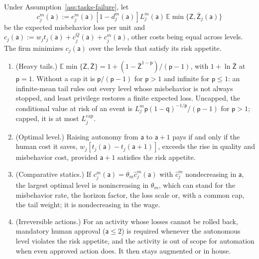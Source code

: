 \begin{proposition}\label{prop:tasks-autonomy}
Under Assumption~\ref{ass:tasks-failure}, let
\[
c^m_j(\mathsf a):=e^m_j(\mathsf a)[1-d^m_j(\mathsf a)]L^m_j(\mathsf a)\,\mathbb E\min\{\mathsf Z,\bar{\mathsf Z}_j(\mathsf a)\}
\]
be the expected misbehavior loss per unit and $c_j(\mathsf a):=w_jt_j(\mathsf a)+c^Q_j(\mathsf a)+c^m_j(\mathsf a)$, other costs being equal across levels. The firm minimizes $c_j(\mathsf a)$ over the levels that satisfy its risk appetite.
\begin{enumerate}
\item[(a)] (Heavy tails.) $\mathbb E\min\{\mathsf Z,\bar{\mathsf Z}\}=1+(1-\bar{\mathsf Z}^{1-\mathsf p})/(\mathsf p-1)$, with $1+\ln\bar{\mathsf Z}$ at $\mathsf p=1$. Without a cap it is $\mathsf p/(\mathsf p-1)$ for $\mathsf p>1$ and infinite for $\mathsf p\le 1$: an infinite-mean tail rules out every level whose misbehavior is not always stopped, and least privilege restores a finite expected loss. Uncapped, the conditional value at risk of an event is $L^m_j\mathsf p(1-\mathsf q)^{-1/\mathsf p}/(\mathsf p-1)$ for $\mathsf p>1$; capped, it is at most $L^{\mathrm{cap}}_j$.
\item[(b)] (Optimal level.) Raising autonomy from $\mathsf a$ to $\mathsf a+1$ pays if and only if the human cost it saves, $w_j[t_j(\mathsf a)-t_j(\mathsf a+1)]$, exceeds the rise in quality and misbehavior cost, provided $\mathsf a+1$ satisfies the risk appetite.
\item[(c)] (Comparative statics.) If $c^m_j(\mathsf a)=\theta_m\hat c^m_j(\mathsf a)$ with $\hat c^m_j$ nondecreasing in $\mathsf a$, the largest optimal level is nonincreasing in $\theta_m$, which can stand for the misbehavior rate, the horizon factor, the loss scale or, with a common cap, the tail weight; it is nondecreasing in the wage.
\item[(d)] (Irreversible actions.) For an activity whose losses cannot be rolled back, mandatory human approval ($\mathsf a\le 2$) is required whenever the autonomous level violates the risk appetite, and the activity is out of scope for automation when even approved action does. It then stays augmented or in house.
\end{enumerate}
\end{proposition}

